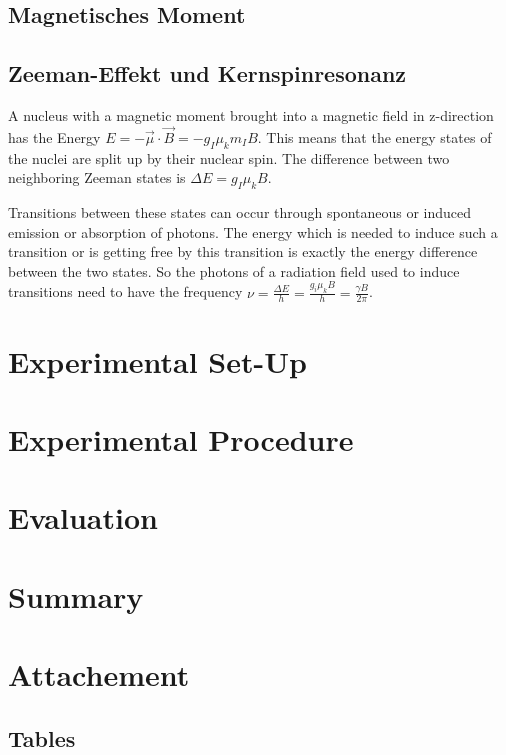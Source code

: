 \documentclass[12pt]{article}
\begin{document}
\subsection{Magnetisches Moment}

\subsection{Zeeman-Effekt und Kernspinresonanz}
A nucleus with a magnetic moment brought into a magnetic field in z-direction has the Energy $E=-\vec\mu\cdot\vec B=-g_I\mu_km_IB$. This means that the energy states of the nuclei are split up by their nuclear spin. The difference between two neighboring Zeeman states is $\Delta E=g_I\mu_kB$.

Transitions between these states can occur through spontaneous or induced emission or absorption of photons. The energy which is needed to induce such a transition or is getting free by this transition is exactly the energy difference between the two states. So the photons of a radiation field used to induce transitions need to have the frequency $\nu=\frac{\Delta E}{h}=\frac{g_i\mu_kB}{h}=\frac{\gamma B}{2\pi}$. 


\newpage
\section{Experimental Set-Up}


\newpage
\section{Experimental Procedure}



\newpage
\section{Evaluation}


\newpage
\section{Summary}


\newpage
\section{Attachement}

\subsection{Tables}
\end{document}
